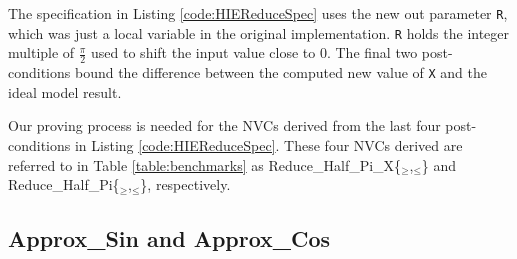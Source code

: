 \documentclass[runningheads]{llncs}
\begin{document}
The specification in Listing \ref{code:HIEReduceSpec} uses the new out parameter \lstinline{R}, which was just a local variable in the original implementation.
\lstinline{R} holds the integer multiple of $\frac{\pi}{2}$ used to shift the input value close to $0$.
The final two post-conditions bound the difference between the computed new value of \lstinline{X} and the ideal model result.

Our proving process is needed for the NVCs derived from the last four post-conditions in Listing \ref{code:HIEReduceSpec}.
These four NVCs derived are referred to in Table \ref{table:benchmarks} as Reduce\_Half\_Pi\_X\{${}_\ge$,${}_\le$\} and Reduce\_Half\_Pi\{${}_\ge$,${}_\le$\}, respectively.

\subsection{Approx\_Sin and Approx\_Cos}
\end{document}
